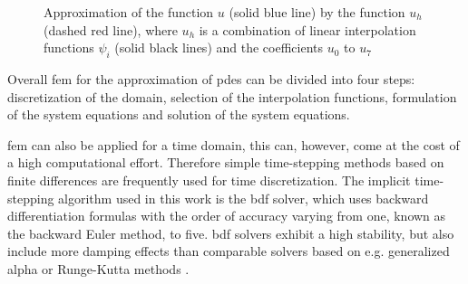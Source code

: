 \begin{figure}[H]
\centering
{}
\caption[Approximation of a function with FEM]{Approximation of the function $u$ (solid blue line) by the function $u_{h}$ (dashed red line), where $u_{h}$ is a combination of linear interpolation functions $\psi_{i}$ (solid black lines) and the coefficients $u_{0}$ to $u_{7}$ \cite{ComsolFEM}
\label{fig:FEM}
}
\end{figure}

Overall \gls{fem} for the approximation of \glspl{pde} can be divided into four steps: discretization of the domain, selection of the interpolation functions, formulation of the system equations and solution of the system equations. 
 
\Gls{fem} can also be applied for a time domain, this can, however, come at the cost of a high computational effort. Therefore simple time-stepping methods based on finite differences are frequently used for time discretization. The implicit time-stepping algorithm used in this work is the \gls{bdf} solver, which uses backward differentiation formulas with the order of accuracy varying from one, known as the backward Euler method, to five. \gls{bdf} solvers exhibit a high stability, but also include more damping effects than comparable solvers based on e.g. generalized alpha or Runge-Kutta methods \cite{ComsolRefManual}.

